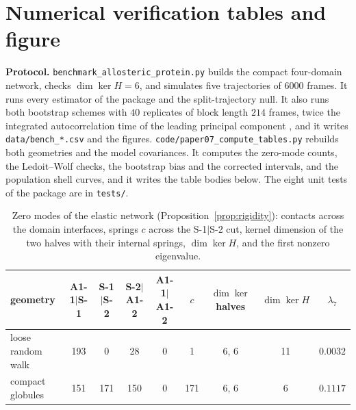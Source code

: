 \documentclass[11pt,reqno]{amsart}
\theoremstyle{plain}
\theoremstyle{definition}
\theoremstyle{remark}
\numberwithin{equation}{section}
\begin{document}
\section*{Numerical verification tables and figure}

{\raggedright
\noindent\textbf{Protocol.} \texttt{benchmark\_allosteric\_protein.py} builds the compact four-domain network, checks $\dim\ker H=6$, and simulates five trajectories of $6000$ frames. It runs every estimator of the package and the split-trajectory null. It also runs both bootstrap schemes with $40$ replicates of block length $214$ frames, twice the integrated autocorrelation time of the leading principal component \cite{Sokal1997}, and it writes \texttt{data/bench\_*.csv} and the figures. \texttt{code/paper07\_compute\_tables.py} rebuilds both geometries and the model covariances. It computes the zero-mode counts, the Ledoit--Wolf checks, the bootstrap bias and the corrected intervals, and the population shell curves, and it writes the table bodies below. The eight unit tests of the package are in \texttt{tests/}.\par}

\begin{table}[ht]
\centering\footnotesize\setlength{\tabcolsep}{3.6pt}
\caption{Zero modes of the elastic network (Proposition~\ref{prop:rigidity}): contacts across the domain interfaces, springs $c$ across the S-1$|$S-2 cut, kernel dimension of the two halves with their internal springs, $\dim\ker H$, and the first nonzero eigenvalue.}
\label{tab:rigidity}
\begin{tabular}{@{}l c c c c c c c c@{}}
\toprule
geometry & A1-1$|$S-1 & S-1$|$S-2 & S-2$|$A1-2 & A1-1$|$A1-2 & $c$ & $\dim\ker$ halves & $\dim\ker H$ & $\lambda_7$ \\
\midrule
loose random walk & 193 & 0 & 28 & 0 & 1 & 6, 6 & 11 & $0.0032$ \\
compact globules & 151 & 171 & 150 & 0 & 171 & 6, 6 & 6 & $0.1117$ \\
\bottomrule
\end{tabular}
\end{table}
\end{document}

